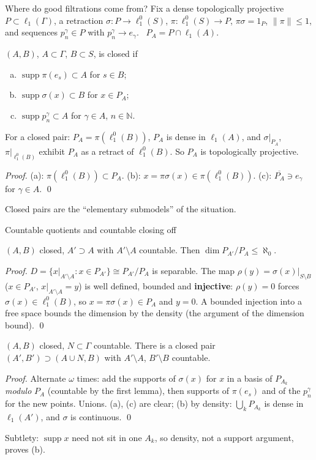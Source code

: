 \documentclass[10pt,aspectratio=169]{beamer}
\newcommand{\lo}[1]{\ell_1^0(#1)}
\newcommand{\ellone}[1]{\ell_1(#1)}
\newcommand{\supp}{\operatorname{supp}}
\newcommand{\NN}{\mathbb N}
\begin{document}
\begin{frame}{Where do good filtrations come from?}
  Fix a dense topologically projective $P\subset\ellone\Gamma$, a retraction
  $\sigma\colon P\to\lo S$, $\pi\colon\lo S\to P$, $\pi\sigma=1_P$, $\|\pi\|\le1$,
  and sequences $p^\gamma_n\in P$ with $p^\gamma_n\to e_\gamma$. \ $P_A=P\cap\ellone A$.
  \begin{definition}
    $(A,B)$, $A\subset\Gamma$, $B\subset S$, is \alert{closed} if
    \begin{enumerate}[(a)]
      \item $\supp\pi(e_s)\subset A$ for $s\in B$;
      \item $\supp\sigma(x)\subset B$ for $x\in P_A$;
      \item $\supp p^\gamma_n\subset A$ for $\gamma\in A$, $n\in\NN$.
    \end{enumerate}
  \end{definition}
  \begin{lemma}
    For a closed pair: $P_A=\pi(\lo B)$, $P_A$ is dense in $\ellone A$, and
    $\sigma|_{P_A}$, $\pi|_{\lo B}$ exhibit $P_A$ as a retract of $\lo B$.
    So $P_A$ is topologically projective.
  \end{lemma}
  \textit{Proof.} (a): $\pi(\lo B)\subset P_A$. (b): $x=\pi\sigma(x)\in\pi(\lo B)$.
  (c): $\overline{P_A}\ni e_\gamma$ for $\gamma\in A$. \qed
  \medskip

  Closed pairs are the ``elementary submodels'' of the situation.
\end{frame}

\begin{frame}{Countable quotients and countable closing off}
  \begin{lemma}
    $(A,B)$ closed, $A'\supset A$ with $A'\setminus A$ countable. Then
    $\dim P_{A'}/P_A\le\aleph_0$.
  \end{lemma}
  \textit{Proof.} $D=\{x|_{A'\setminus A}:x\in P_{A'}\}\cong P_{A'}/P_A$ is
  separable. The map $\rho(y)=\sigma(x)|_{S\setminus B}$ ($x\in P_{A'}$, $x|_{A'\setminus A}=y$)
  is well defined, bounded and \textbf{injective}: $\rho(y)=0$ forces
  $\sigma(x)\in\lo B$, so $x=\pi\sigma(x)\in P_A$ and $y=0$. A bounded injection
  into a free space bounds the dimension by the density (the argument of the
  dimension bound). \qed
  \begin{lemma}
    $(A,B)$ closed, $N\subset\Gamma$ countable. There is a closed pair
    $(A',B')\supset(A\cup N,B)$ with $A'\setminus A$, $B'\setminus B$ countable.
  \end{lemma}
  \textit{Proof.} Alternate $\omega$ times: add the supports of $\sigma(x)$ for $x$ in a
  basis of $P_{A_k}$ \emph{modulo} $P_A$ (countable by the first lemma), then
  supports of $\pi(e_s)$ and of the $p^\gamma_n$ for the new points. Unions.
  (a), (c) are clear; (b) by density: $\bigcup_kP_{A_k}$ is dense in $\ellone{A'}$,
  and $\sigma$ is continuous. \qed
  \medskip

  Subtlety: $\supp x$ need not sit in one $A_k$, so density, not a support
  argument, proves (b).
\end{frame}
\end{document}
